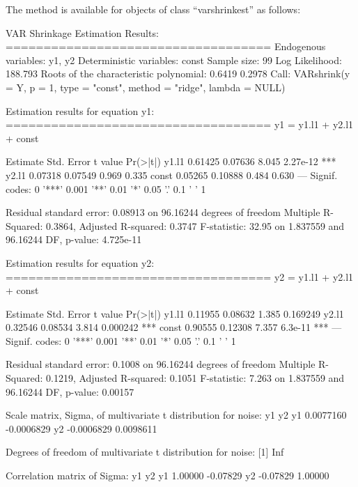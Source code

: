 \documentclass[
]{jss}
\begin{document}
The method  is available for objects of class
``varshrinkest'' as follows:

\begin{CodeChunk}


\begin{CodeOutput}

VAR Shrinkage Estimation Results:
=================================== 
Endogenous variables: y1, y2 
Deterministic variables: const 
Sample size: 99 
Log Likelihood: 188.793 
Roots of the characteristic polynomial:
0.6419 0.2978
Call:
VARshrink(y = Y, p = 1, type = "const", method = "ridge", lambda = NULL)


Estimation results for equation y1: 
=================================== 
y1 = y1.l1 + y2.l1 + const 

      Estimate Std. Error t value Pr(>|t|)    
y1.l1  0.61425    0.07636   8.045 2.27e-12 ***
y2.l1  0.07318    0.07549   0.969    0.335    
const  0.05265    0.10888   0.484    0.630    
---
Signif. codes:  0 '***' 0.001 '**' 0.01 '*' 0.05 '.' 0.1 ' ' 1


Residual standard error: 0.08913 on 96.16244 degrees of freedom
Multiple R-Squared: 0.3864, Adjusted R-squared: 0.3747 
F-statistic: 32.95 on 1.837559 and 96.16244 DF,  p-value: 4.725e-11 


Estimation results for equation y2: 
=================================== 
y2 = y1.l1 + y2.l1 + const 

      Estimate Std. Error t value Pr(>|t|)    
y1.l1  0.11955    0.08632   1.385 0.169249    
y2.l1  0.32546    0.08534   3.814 0.000242 ***
const  0.90555    0.12308   7.357  6.3e-11 ***
---
Signif. codes:  0 '***' 0.001 '**' 0.01 '*' 0.05 '.' 0.1 ' ' 1


Residual standard error: 0.1008 on 96.16244 degrees of freedom
Multiple R-Squared: 0.1219, Adjusted R-squared: 0.1051 
F-statistic: 7.263 on 1.837559 and 96.16244 DF,  p-value: 0.00157 



Scale matrix, Sigma, of multivariate t distribution for noise:
           y1         y2
y1  0.0077160 -0.0006829
y2 -0.0006829  0.0098611

Degrees of freedom of multivariate t distribution for noise:
[1] Inf

Correlation matrix of Sigma:
         y1       y2
y1  1.00000 -0.07829
y2 -0.07829  1.00000
\end{CodeOutput}
\end{CodeChunk}
\end{document}
